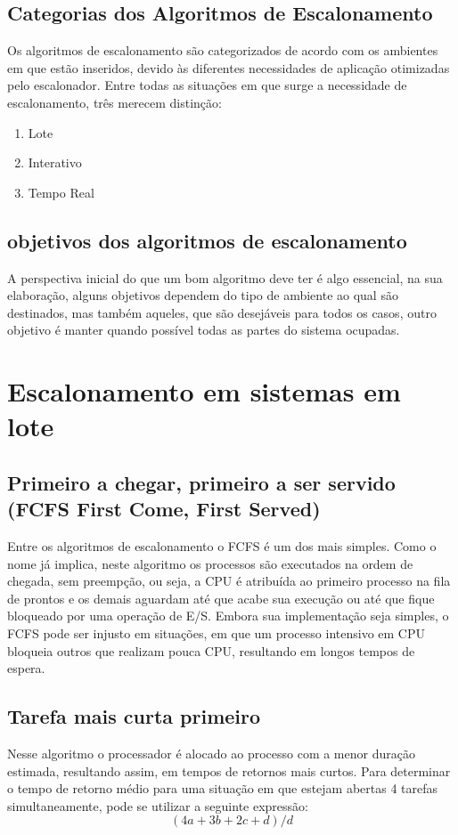 \documentclass{article}
\begin{document}
\subsection{Categorias dos Algoritmos de Escalonamento}
Os algoritmos de escalonamento são categorizados de acordo com os ambientes em que estão inseridos, devido às diferentes necessidades de aplicação otimizadas pelo escalonador. Entre todas as situações em que surge a necessidade de escalonamento, três merecem distinção:

\begin{enumerate}
    \item Lote
    \item Interativo
    \item Tempo Real
\end{enumerate}
\subsection{objetivos dos algoritmos de escalonamento}
A perspectiva inicial do que um bom algoritmo deve ter é algo essencial, na sua elaboração, alguns objetivos dependem do tipo de ambiente ao qual são destinados, mas também aqueles, que são desejáveis para todos os casos, outro objetivo é manter quando possível todas as partes do sistema ocupadas.
\section{Escalonamento em sistemas em lote}
\subsection{Primeiro a chegar, 	primeiro a ser servido (FCFS  First Come, First Served)
}
Entre os algoritmos de escalonamento o FCFS é um dos mais simples. Como o nome já implica, neste algoritmo os processos são executados na ordem de chegada, sem preempção, ou seja, a CPU é atribuída ao primeiro processo na fila de prontos e os demais aguardam até que acabe sua execução ou até que fique bloqueado por uma operação de E/S. Embora sua implementação seja simples, o FCFS pode ser injusto em situações, em que um processo intensivo em CPU bloqueia outros que realizam pouca CPU, resultando em longos tempos de espera.
\subsection{Tarefa mais curta primeiro}
Nesse algoritmo o processador é alocado ao processo com a menor duração estimada, resultando assim, em tempos de retornos mais curtos. Para determinar o tempo de retorno médio para uma situação em que estejam abertas 4 tarefas simultaneamente, pode se utilizar a seguinte expressão:
\[(4a+3b+2c+d)/d\]
\end{document}
